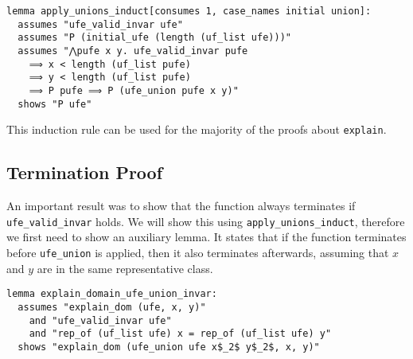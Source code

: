 \begin{lstlisting}
lemma apply_unions_induct[consumes 1, case_names initial union]:
  assumes "ufe_valid_invar ufe"
  assumes "P (initial_ufe (length (uf_list ufe)))"
  assumes "⋀pufe x y. ufe_valid_invar pufe
    ⟹ x < length (uf_list pufe)
    ⟹ y < length (uf_list pufe)
    ⟹ P pufe ⟹ P (ufe_union pufe x y)"
  shows "P ufe"
\end{lstlisting}

This induction rule can be used for the majority of the proofs about \lstinline|explain|.

\subsection{Termination Proof}
\label{subsection:termination}

An important result was to show that the function always terminates if \lstinline{ufe_valid_invar} holds. We will show this using \lstinline|apply_unions_induct|, therefore we first need to show an auxiliary lemma. It states that if the function terminates before \lstinline{ufe_union} is applied, then it also terminates afterwards, assuming that $x$ and $y$ are in the same representative class.

\begin{lstlisting}
lemma explain_domain_ufe_union_invar:
  assumes "explain_dom (ufe, x, y)"
    and "ufe_valid_invar ufe"
    and "rep_of (uf_list ufe) x = rep_of (uf_list ufe) y"
  shows "explain_dom (ufe_union ufe x$_2$ y$_2$, x, y)"
\end{lstlisting}

